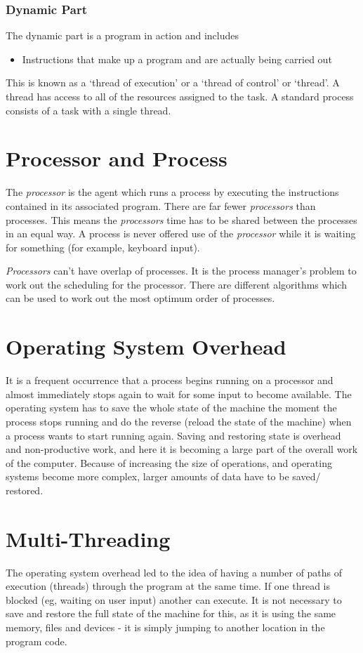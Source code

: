 \subsubsection{Dynamic Part}
The dynamic part is a program in action and includes
\begin{itemize}
    \item Instructions that make up a program and are actually being carried out
\end{itemize}
This is known as a `thread of execution' or a `thread of control' or `thread'. A thread has access to all of the resources assigned to the task. A standard process consists of a task with a single thread.

\section{Processor and Process}
The \textit{processor} is the agent which runs a process by executing the instructions contained in its associated program. There are far fewer \textit{processors} than processes. This means the \textit{processors} time has to be shared between the processes in an equal way. A process is never offered use of the \textit{processor} while it is waiting for something (for example, keyboard input). 

\textit{Processors} can't have overlap of processes. It is the process manager's problem to work out the scheduling for the processor. There are different algorithms which can be used to work out the most optimum order of processes. 

\section{Operating System Overhead}
It is a frequent occurrence that a process begins running on a processor and almost immediately stops again to wait for some input to become available. The operating system has to save the whole state of the machine the moment the process stops running and do the reverse (reload the state of the machine) when a process wants to start running again. Saving and restoring state is overhead and non-productive work, and here it is becoming a large part of the overall work of the computer. Because of increasing the size of operations, and operating systems become more complex, larger amounts of data have to be saved/ restored. 

\section{Multi-Threading}
The operating system overhead led to the idea of having a number of paths of execution (threads) through the program at the same time. If one thread is blocked (eg, waiting on user input) another can execute. It is not necessary to save and restore the full state of the machine for this, as it is using the same memory, files and devices - it is simply jumping to another location in the program code.

